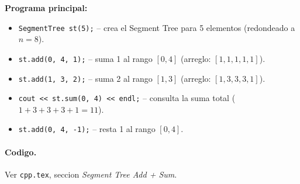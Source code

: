 \textbf{Programa principal:}
\begin{itemize}\setlength\itemsep{0pt}
	\item \verb|SegmentTree st(5);| -- crea el Segment Tree para 5 elementos (redondeado a $n = 8$).
	\item \verb|st.add(0, 4, 1);| -- suma 1 al rango $[0, 4]$ (arreglo: $[1, 1, 1, 1, 1]$).
	\item \verb|st.add(1, 3, 2);| -- suma 2 al rango $[1, 3]$ (arreglo: $[1, 3, 3, 3, 1]$).
	\item \verb|cout << st.sum(0, 4) << endl;| -- consulta la suma total ($1 + 3 + 3 + 3 + 1 = 11$).
	\item \verb|st.add(0, 4, -1);| -- resta 1 al rango $[0, 4]$.
\end{itemize}

\paragraph{Codigo.}
Ver \texttt{cpp.tex}, seccion \textit{Segment Tree Add + Sum}.

\vspace{0.5em}

